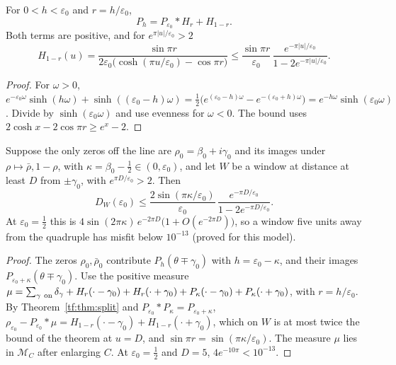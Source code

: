 \begin{theorem}\label{tf:thm:split}
For $0<h<\varepsilon_0$ and $r=h/\varepsilon_0$,
\[
P_h=P_{\varepsilon_0}*H_r+H_{1-r}.
\]
Both terms are positive, and for $e^{\pi|u|/\varepsilon_0}>2$
\[
H_{1-r}(u)=\frac{\sin\pi r}{2\varepsilon_0\bigl(\cosh(\pi u/\varepsilon_0)-\cos\pi r\bigr)}\le\frac{\sin\pi r}{\varepsilon_0}\,\frac{e^{-\pi|u|/\varepsilon_0}}{1-2e^{-\pi|u|/\varepsilon_0}}.
\]
\end{theorem}

\begin{proof}
For $\omega>0$, $e^{-\varepsilon_0\omega}\sinh(h\omega)+\sinh((\varepsilon_0-h)\omega)=\tfrac12\bigl(e^{(\varepsilon_0-h)\omega}-e^{-(\varepsilon_0+h)\omega}\bigr)=e^{-h\omega}\sinh(\varepsilon_0\omega)$. Divide by $\sinh(\varepsilon_0\omega)$ and use evenness for $\omega<0$. The bound uses $2\cosh x-2\cos\pi r\ge e^x-2$.
\end{proof}

\begin{corollary}\label{tf:cor:hidden}
Suppose the only zeros off the line are $\rho_0=\beta_0+i\gamma_0$ and its images under $\rho\mapsto\bar\rho,1-\rho$, with $\kappa=\beta_0-\tfrac12\in(0,\varepsilon_0)$, and let $W$ be a window at distance at least $D$ from $\pm\gamma_0$, with $e^{\pi D/\varepsilon_0}>2$. Then
\[
D_W(\varepsilon_0)\le\frac{2\sin(\pi\kappa/\varepsilon_0)}{\varepsilon_0}\,\frac{e^{-\pi D/\varepsilon_0}}{1-2e^{-\pi D/\varepsilon_0}}.
\]
At $\varepsilon_0=\tfrac12$ this is $4\sin(2\pi\kappa)\,e^{-2\pi D}\bigl(1+O(e^{-2\pi D})\bigr)$, so a window five units away from the quadruple has misfit below $10^{-13}$ (proved for this model).
\end{corollary}

\begin{proof}
The zeros $\rho_0,\bar\rho_0$ contribute $P_h(\theta\mp\gamma_0)$ with $h=\varepsilon_0-\kappa$, and their images $P_{\varepsilon_0+\kappa}(\theta\mp\gamma_0)$. Use the positive measure $\mu=\sum_{\gamma\ {\rm on}}\delta_\gamma+H_r(\cdot-\gamma_0)+H_r(\cdot+\gamma_0)+P_\kappa(\cdot-\gamma_0)+P_\kappa(\cdot+\gamma_0)$, with $r=h/\varepsilon_0$. By Theorem~\ref{tf:thm:split} and $P_{\varepsilon_0}*P_\kappa=P_{\varepsilon_0+\kappa}$, $\rho_{\varepsilon_0}-P_{\varepsilon_0}*\mu=H_{1-r}(\cdot-\gamma_0)+H_{1-r}(\cdot+\gamma_0)$, which on $W$ is at most twice the bound of the theorem at $u=D$, and $\sin\pi r=\sin(\pi\kappa/\varepsilon_0)$. The measure $\mu$ lies in $\mathcal M_C$ after enlarging $C$. At $\varepsilon_0=\tfrac12$ and $D=5$, $4e^{-10\pi}<10^{-13}$.
\end{proof}

